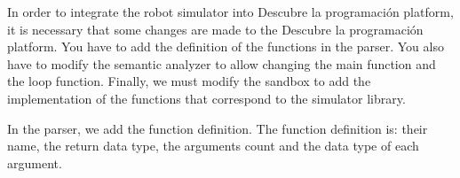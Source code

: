 %


In order to integrate the robot simulator  into Descubre la programación platform, it is necessary that some changes are made to the Descubre la programación platform. You have to add the definition of the functions in the parser. You also have to modify the semantic analyzer to allow changing the main function and the loop function. Finally, we must modify the sandbox to add the implementation of the functions that correspond to the simulator library.

In the parser, we add the function definition. The function definition is: their name, the return data type, the arguments count and the data type of each argument.


%


